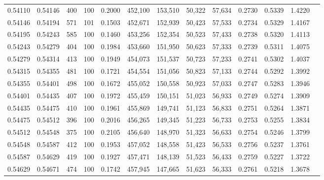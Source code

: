 \begin{tabular}{rrrrrrrrrrrrr}
0.54110 & 0.54146 &   400 & 100 &                                     0.2000 & 452,100 & 153,510 &  50,322 &  57,634 & 0.2730 & 0.5339 & 1.4220 \\
0.54146 & 0.54194 &   571 & 101 &                                     0.1503 & 452,671 & 152,939 &  50,423 &  57,533 & 0.2734 & 0.5329 & 1.4167 \\
0.54195 & 0.54243 &   585 & 100 &                                     0.1460 & 453,256 & 152,354 &  50,523 &  57,433 & 0.2738 & 0.5320 & 1.4113 \\
0.54243 & 0.54279 &   404 & 100 &                                     0.1984 & 453,660 & 151,950 &  50,623 &  57,333 & 0.2739 & 0.5311 & 1.4075 \\
0.54279 & 0.54314 &   413 & 100 &                                     0.1949 & 454,073 & 151,537 &  50,723 &  57,233 & 0.2741 & 0.5302 & 1.4037 \\
0.54315 & 0.54355 &   481 & 100 &                                     0.1721 & 454,554 & 151,056 &  50,823 &  57,133 & 0.2744 & 0.5292 & 1.3992 \\
0.54355 & 0.54401 &   498 & 100 &                                     0.1672 & 455,052 & 150,558 &  50,923 &  57,033 & 0.2747 & 0.5283 & 1.3946 \\
0.54401 & 0.54435 &   407 & 100 &                                     0.1972 & 455,459 & 150,151 &  51,023 &  56,933 & 0.2749 & 0.5274 & 1.3909 \\
0.54435 & 0.54475 &   410 & 100 &                                     0.1961 & 455,869 & 149,741 &  51,123 &  56,833 & 0.2751 & 0.5264 & 1.3871 \\
0.54475 & 0.54512 &   396 & 100 &                                     0.2016 & 456,265 & 149,345 &  51,223 &  56,733 & 0.2753 & 0.5255 & 1.3834 \\
0.54512 & 0.54548 &   375 & 100 &                                     0.2105 & 456,640 & 148,970 &  51,323 &  56,633 & 0.2754 & 0.5246 & 1.3799 \\
0.54548 & 0.54587 &   412 & 100 &                                     0.1953 & 457,052 & 148,558 &  51,423 &  56,533 & 0.2756 & 0.5237 & 1.3761 \\
0.54587 & 0.54629 &   419 & 100 &                                     0.1927 & 457,471 & 148,139 &  51,523 &  56,433 & 0.2759 & 0.5227 & 1.3722 \\
0.54629 & 0.54671 &   474 & 100 &                                     0.1742 & 457,945 & 147,665 &  51,623 &  56,333 & 0.2761 & 0.5218 & 1.3678 \\

\end{tabular}
